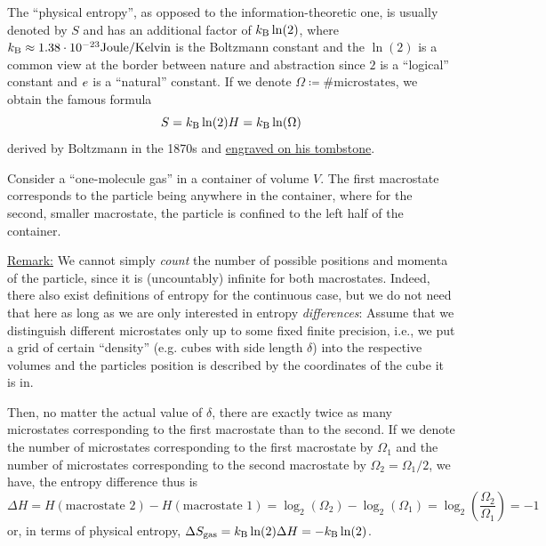 The ``physical entropy'', as opposed to the information-theoretic one, is usually denoted by $S$ and has an additional factor of 
$k_{\mathrm{B}} \ln(2)$,
where $k_{\mathrm{B}} \approx 1.38 \cdot 10^{-23} \text{Joule}/\text{Kelvin}$ is the Boltzmann constant
and
the $\ln(2)$ is a common view at the border between nature and abstraction since $2$ is a ``logical'' constant and $e$ is a ``natural'' constant.
If we denote $\Omega \coloneq \text{\# microstates}$, we obtain the famous formula
\[
S
=
k_{\mathrm{B}} 
\ln(2) 
H
=
k_{\mathrm{B}} \ln(\Omega)
\]
derived by Boltzmann in the 1870s and \href{https://en.wikipedia.org/wiki/Boltzmann%27s_entropy_formula}{engraved on his tombstone}.



\begin{example}\label{ex:one-molecule-gas}
Consider a ``one-molecule gas'' in a container of volume $V$.
The first macrostate corresponds to the particle being anywhere in the container, where for the second, smaller macrostate, the particle is confined to the left half of the container.

\underline{Remark:}
We cannot simply \emph{count} the number of possible positions and momenta of the particle, since it is (uncountably) infinite for both macrostates.
Indeed, there also exist definitions of entropy for the continuous case, but we do not need that here as long as we are only interested in entropy \emph{differences}:
Assume that we distinguish different microstates only up to some fixed finite precision, i.e., we put a grid of certain ``density'' (e.g. cubes with side length $\delta$) into the respective volumes and the particles position is described by the coordinates of the cube it is in.

Then, no matter the actual value of $\delta$, there are exactly twice as many microstates corresponding to the first macrostate than to the second.
If we denote the number of microstates corresponding to the first macrostate by $\Omega_1$ and the number of microstates corresponding to the second macrostate by $\Omega_2 = \Omega_1 / 2$, we have, the entropy difference thus is
\[
\Delta H 
=
H(\text{macrostate 2}) - H(\text{macrostate 1}) 
=
\log_2(\Omega_2) - \log_2(\Omega_1) 
=
\log_2\left(\frac{\Omega_2}{\Omega_1}\right) 
=
-1
\]
or, in terms of physical entropy, $\Delta S_{\text{gas}}
 = k_{\mathrm{B}} \ln(2) \Delta H = -k_{\mathrm{B}} \ln(2)$.
\end{example}


